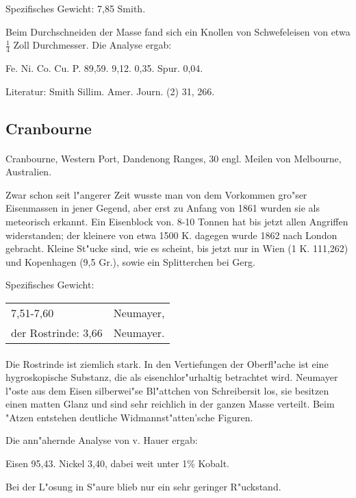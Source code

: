 \documentclass[a4paper, 11pt, oneside]{article}
\begin{document}
Spezifisches Gewicht: 7,85 Smith.

Beim Durchschneiden der Masse fand sich ein Knollen von Schwefeleisen von etwa $\frac{1}{4}$ Zoll Durchmesser. Die Analyse ergab:

Fe. Ni. Co. Cu. P.  
89,59. 9,12. 0,35. Spur. 0,04.

Literatur: Smith Sillim. Amer. Journ. (2) 31, 266.

\subsection{Cranbourne}
\normalsize
\paragraph{}
Cranbourne, Western Port, Dandenong Ranges, 30 engl. Meilen von Melbourne, Australien.

Zwar schon seit l"angerer Zeit wusste man von dem Vorkommen gro"ser Eisenmassen in jener Gegend, aber erst zu Anfang von 1861 wurden sie als meteorisch erkannt. Ein Eisenblock von. 8-10 Tonnen hat bis jetzt allen Angriffen widerstanden; der kleinere von etwa 1500 K. dagegen wurde 1862 nach London gebracht. Kleine St"ucke sind, wie es scheint, bis jetzt nur in Wien (1 K. 111,262) und Kopenhagen (9,5 Gr.), sowie ein Splitterchen bei Gerg.

Spezifisches Gewicht: 
\begin{table}[!ht]
    \centering
    \begin{tabular}{l l}
        7,51-7,60 & Neumayer,\\
        der Rostrinde: 3,66 & Neumayer.
    \end{tabular}
\end{table}
\paragraph{}
Die Rostrinde ist ziemlich stark. In den Vertiefungen der Oberfl"ache ist eine hygroskopische Substanz, die als eisenchlor"urhaltig betrachtet wird. Neumayer l"oste aus dem Eisen silberwei"se Bl"attchen von Schreibersit los, sie besitzen einen matten Glanz und sind sehr reichlich in der ganzen Masse verteilt. Beim "Atzen entstehen deutliche Widmannst"atten'sche Figuren.

Die ann"ahernde Analyse von v. Hauer ergab:

Eisen 95,43.
Nickel 3,40, dabei weit unter 1\% Kobalt.

Bei der L"osung in S"aure blieb nur ein sehr geringer R"uckstand.
\end{document}
